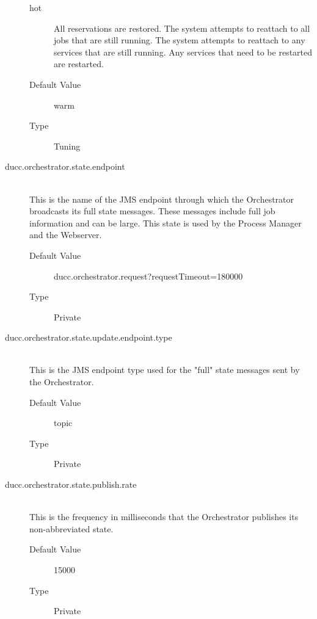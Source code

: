 \begin{description}
\begin{description}
            \item[hot] All reservations are restored. The system attempts to reattach to all jobs that are 
              still running. The system attempts to reattach to any services that are still running. 
              Any services that need to be restarted are restarted.
            \end{description}

          \begin{description}
          \item[Default Value] warm 
          \item[Type] Tuning 
        \end{description}
        

      \item[ducc.orchestrator.state.endpoint] \hfill \\
        This is the name of the JMS endpoint through which the Orchestrator broadcasts its full 
        state messages. These messages include full job information and can be large. This state is 
        used by the Process Manager and the Webserver. 
        \begin{description}
          \item[Default Value] ducc.orchestrator.request?requestTimeout=180000
          \item[Type] Private 
        \end{description}

      \item[ducc.orchestrator.state.update.endpoint.type] \hfill \\
        This is the JMS endpoint type used for the "full" state messages sent by the Orchestrator. 
        \begin{description}
          \item[Default Value] topic 
          \item[Type] Private
        \end{description} 
        
      \item[ducc.orchestrator.state.publish.rate] \hfill \\
        This is the frequency in milliseconds that the Orchestrator publishes its non-abbreviated 
        state. 
        \begin{description}
          \item[Default Value] 15000 
          \item[Type] Private 
        \end{description}
        

\end{description}
